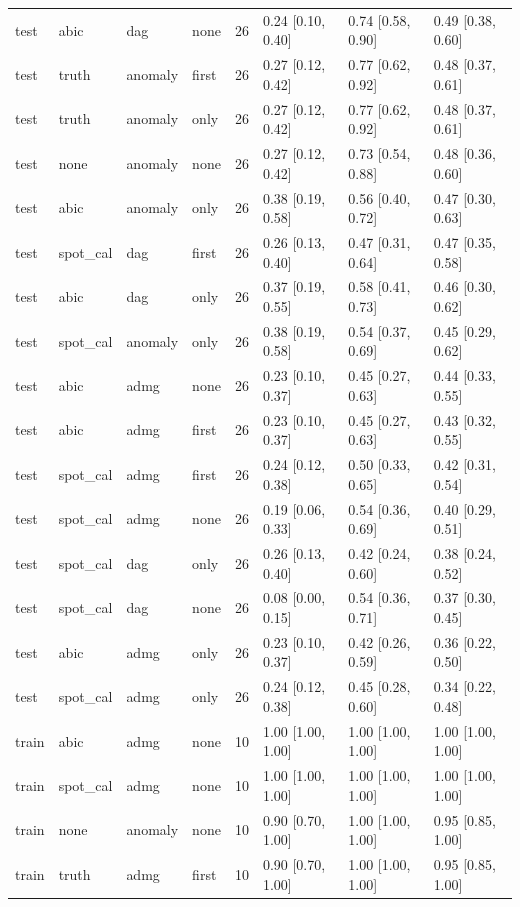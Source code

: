 \begin{table}[t]
\begin{tabular}{@{}llllllll@{}}
test & abic & dag & none & 26 & 0.24 [0.10, 0.40] & 0.74 [0.58, 0.90] & 0.49 [0.38, 0.60]\\
test & truth & anomaly & first & 26 & 0.27 [0.12, 0.42] & 0.77 [0.62, 0.92] & 0.48 [0.37, 0.61]\\
test & truth & anomaly & only & 26 & 0.27 [0.12, 0.42] & 0.77 [0.62, 0.92] & 0.48 [0.37, 0.61]\\
test & none & anomaly & none & 26 & 0.27 [0.12, 0.42] & 0.73 [0.54, 0.88] & 0.48 [0.36, 0.60]\\
test & abic & anomaly & only & 26 & 0.38 [0.19, 0.58] & 0.56 [0.40, 0.72] & 0.47 [0.30, 0.63]\\
test & spot\_cal & dag & first & 26 & 0.26 [0.13, 0.40] & 0.47 [0.31, 0.64] & 0.47 [0.35, 0.58]\\
test & abic & dag & only & 26 & 0.37 [0.19, 0.55] & 0.58 [0.41, 0.73] & 0.46 [0.30, 0.62]\\
test & spot\_cal & anomaly & only & 26 & 0.38 [0.19, 0.58] & 0.54 [0.37, 0.69] & 0.45 [0.29, 0.62]\\
test & abic & admg & none & 26 & 0.23 [0.10, 0.37] & 0.45 [0.27, 0.63] & 0.44 [0.33, 0.55]\\
test & abic & admg & first & 26 & 0.23 [0.10, 0.37] & 0.45 [0.27, 0.63] & 0.43 [0.32, 0.55]\\
test & spot\_cal & admg & first & 26 & 0.24 [0.12, 0.38] & 0.50 [0.33, 0.65] & 0.42 [0.31, 0.54]\\
test & spot\_cal & admg & none & 26 & 0.19 [0.06, 0.33] & 0.54 [0.36, 0.69] & 0.40 [0.29, 0.51]\\
test & spot\_cal & dag & only & 26 & 0.26 [0.13, 0.40] & 0.42 [0.24, 0.60] & 0.38 [0.24, 0.52]\\
test & spot\_cal & dag & none & 26 & 0.08 [0.00, 0.15] & 0.54 [0.36, 0.71] & 0.37 [0.30, 0.45]\\
test & abic & admg & only & 26 & 0.23 [0.10, 0.37] & 0.42 [0.26, 0.59] & 0.36 [0.22, 0.50]\\
test & spot\_cal & admg & only & 26 & 0.24 [0.12, 0.38] & 0.45 [0.28, 0.60] & 0.34 [0.22, 0.48]\\
train & abic & admg & none & 10 & 1.00 [1.00, 1.00] & 1.00 [1.00, 1.00] & 1.00 [1.00, 1.00]\\
train & spot\_cal & admg & none & 10 & 1.00 [1.00, 1.00] & 1.00 [1.00, 1.00] & 1.00 [1.00, 1.00]\\
train & none & anomaly & none & 10 & 0.90 [0.70, 1.00] & 1.00 [1.00, 1.00] & 0.95 [0.85, 1.00]\\
train & truth & admg & first & 10 & 0.90 [0.70, 1.00] & 1.00 [1.00, 1.00] & 0.95 [0.85, 1.00]\\

\end{tabular}
\end{table}
